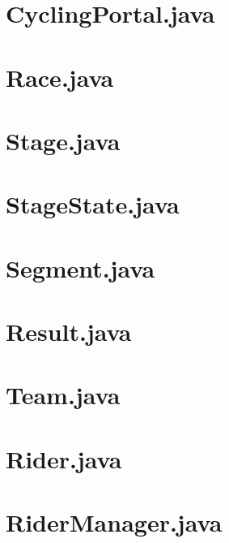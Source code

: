 \documentclass{article}
\begin{document}
\section{CyclingPortal.java}


\section{Race.java}


\section{Stage.java}


\section{StageState.java}


\section{Segment.java}


\section{Result.java}


\section{Team.java}


\section{Rider.java}


\section{RiderManager.java}

\end{document}

